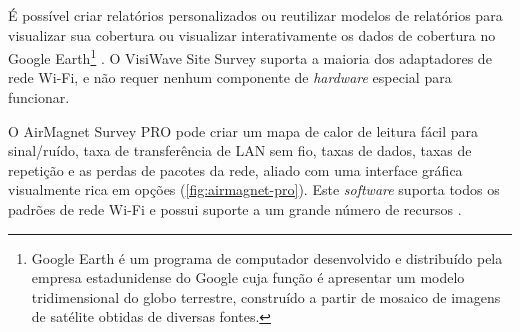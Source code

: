 É possível criar relatórios personalizados ou reutilizar modelos de relatórios para visualizar sua cobertura ou visualizar interativamente os dados de cobertura no Google Earth\footnote[5]{Google Earth é um programa de computador desenvolvido e distribuído pela empresa estadunidense do Google cuja função é apresentar um modelo tridimensional do globo terrestre, construído a partir de mosaico de imagens de satélite obtidas de diversas fontes.} \cite{Netspot2019}. O VisiWave Site Survey suporta a maioria dos adaptadores de rede Wi-Fi, e não requer nenhum componente de \textit{hardware} especial para funcionar.
\newpage
\begin{figure}[H]
	\centering
\end{figure}

\label{subsubsubsec:airmagnet-pro}

O AirMagnet Survey PRO pode criar um mapa de calor de leitura fácil para sinal/ruído, taxa de transferência de LAN sem fio, taxas de dados, taxas de repetição e as perdas de pacotes da rede, aliado com uma interface gráfica visualmente rica em opções (\autoref{fig:airmagnet-pro}). Este \textit{software} suporta todos os padrões de rede Wi-Fi e possui suporte a um grande número de recursos \cite{Netspot2019}.

